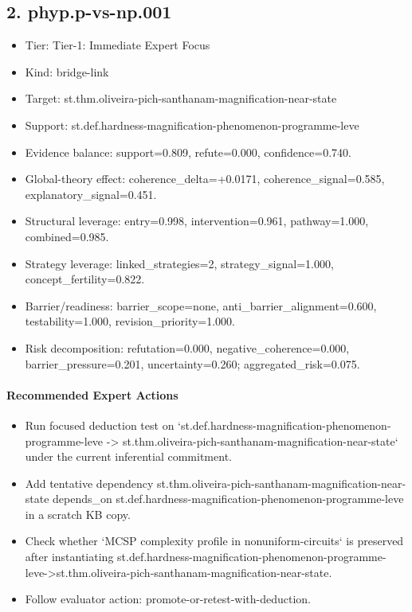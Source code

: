 \documentclass[11pt]{article}
\begin{document}
\subsection*{2. phyp.p-vs-np.001}
\begin{itemize}
\item Tier: Tier-1: Immediate Expert Focus
\item Kind: bridge-link
\item Target: st.thm.oliveira-pich-santhanam-magnification-near-state
\item Support: st.def.hardness-magnification-phenomenon-programme-leve
\item Evidence balance: support=0.809, refute=0.000, confidence=0.740.
\item Global-theory effect: coherence\_delta=+0.0171, coherence\_signal=0.585, explanatory\_signal=0.451.
\item Structural leverage: entry=0.998, intervention=0.961, pathway=1.000, combined=0.985.
\item Strategy leverage: linked\_strategies=2, strategy\_signal=1.000, concept\_fertility=0.822.
\item Barrier/readiness: barrier\_scope=none, anti\_barrier\_alignment=0.600, testability=1.000, revision\_priority=1.000.
\item Risk decomposition: refutation=0.000, negative\_coherence=0.000, barrier\_pressure=0.201, uncertainty=0.260; aggregated\_risk=0.075.
\end{itemize}
\paragraph{Recommended Expert Actions}
\begin{itemize}
\item Run focused deduction test on `st.def.hardness-magnification-phenomenon-programme-leve -> st.thm.oliveira-pich-santhanam-magnification-near-state` under the current inferential commitment.
\item Add tentative dependency st.thm.oliveira-pich-santhanam-magnification-near-state depends\_on st.def.hardness-magnification-phenomenon-programme-leve in a scratch KB copy.
\item Check whether `MCSP complexity profile in nonuniform-circuits` is preserved after instantiating st.def.hardness-magnification-phenomenon-programme-leve->st.thm.oliveira-pich-santhanam-magnification-near-state.
\item Follow evaluator action: promote-or-retest-with-deduction.
\end{itemize}
\end{document}
